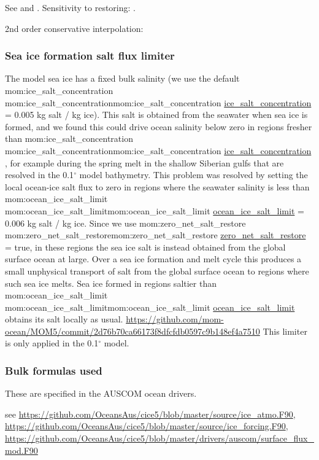 \documentclass[11pt]{article}
\makeatletter
\newcommand{\TODO}[1]{\note{\textcolor{blue}{\textsf{\textbf{TODO: #1}}}}}
\newcommand*{\make@hex@label}[1]{%
  \def\hex@label{#1}%
  \@onelevel@sanitize\hex@label
  \EdefEscapeHex\hex@label{\hex@label}%
}
\newcommand*{\hexhyperlink}[2]{%
  \make@hex@label{#1}%
  \hyperlink{\hex@label}{#2}%
}
\newcommand{\momlink}[2]{\hexhyperlink{mom:#2}{#1}}
\newcommand{\param}[1]{\textsf{#1}}
\newcommand{\mom}[1]{\param{\momlink{#1}{#1}}}
\makeatother
\begin{document}
See \citet[][section~2.3]{GriffiesETAL2016a} and \citet[][Appendix~C]{DanabasogluYeagerBaileyBehrensBentsenBiBiastochBoningBozec2014a}.
Sensitivity to restoring: \citet{BehrensBiastochBoning2013a}.

2nd order conservative interpolation:
\citet{KritsikisAechtnerMeurdesoifDubos2017a}

\subsubsection{Sea ice formation salt flux limiter}
The model sea ice has a fixed bulk salinity (we use the default \mom{ice_salt_concentration} = 0.005 kg salt / kg ice). 
This salt is obtained from the seawater when sea ice is formed, and we found this could drive ocean salinity below zero in regions fresher than \mom{ice_salt_concentration}, for example during the spring melt in the shallow Siberian gulfs that are resolved in the 0.1$^\circ$ model bathymetry.
This problem was resolved by setting the local ocean-ice salt flux to zero in regions where the seawater salinity is less than \mom{ocean_ice_salt_limit} = 0.006 kg salt / kg ice.
Since we use \mom{zero_net_salt_restore} = true, in these regions the sea ice salt is instead obtained from the global surface ocean at large.
Over a sea ice formation and melt cycle this produces a small unphysical transport of salt from the global surface ocean to regions where such sea ice melts.
Sea ice formed in regions saltier than \mom{ocean_ice_salt_limit} obtains its salt locally as usual.
\TODO{get Russ to check this} 
\url{https://github.com/mom-ocean/MOM5/commit/2d76b70ca66173f8dfcfdb0597c9b148ef4a7510}
This limiter is only applied in the 0.1$^\circ$ model.

\subsubsection{Bulk formulas used}
These are specified in the AUSCOM ocean drivers.

see \url{https://github.com/OceansAus/cice5/blob/master/source/ice_atmo.F90}, 
\url{https://github.com/OceansAus/cice5/blob/master/source/ice_forcing.F90},
\url{https://github.com/OceansAus/cice5/blob/master/drivers/auscom/surface_flux_mod.F90}
\end{document}
